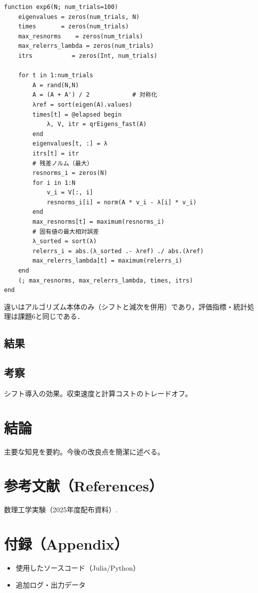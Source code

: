 \documentclass[a4paper,11pt]{ltjsarticle}
\begin{document}
\begin{verbatim}
function exp6(N; num_trials=100)
    eigenvalues = zeros(num_trials, N)
    times       = zeros(num_trials)
    max_resnorms    = zeros(num_trials)
    max_relerrs_lambda = zeros(num_trials)
    itrs           = zeros(Int, num_trials)

    for t in 1:num_trials
        A = rand(N,N)
        A = (A + A') / 2            # 対称化
        λref = sort(eigen(A).values)
        times[t] = @elapsed begin
            λ, V, itr = qrEigens_fast(A)
        end
        eigenvalues[t, :] = λ
        itrs[t] = itr
        # 残差ノルム（最大）
        resnorms_i = zeros(N)
        for i in 1:N
            v_i = V[:, i]
            resnorms_i[i] = norm(A * v_i - λ[i] * v_i)
        end
        max_resnorms[t] = maximum(resnorms_i)
        # 固有値の最大相対誤差
        λ_sorted = sort(λ)
        relerrs_i = abs.(λ_sorted .- λref) ./ abs.(λref)
        max_relerrs_lambda[t] = maximum(relerrs_i)
    end
    (; max_resnorms, max_relerrs_lambda, times, itrs)
end
\end{verbatim}

違いはアルゴリズム本体のみ（シフトと減次を併用）であり，評価指標・統計処理は課題6と同じである．


\subsection{結果}

\subsection{考察}
シフト導入の効果。収束速度と計算コストのトレードオフ。

\section{結論}
主要な知見を要約。今後の改良点を簡潔に述べる。

\section*{参考文献（References）}
\begin{thebibliography}{99}
 数理工学実験（2025年度配布資料）.
\end{thebibliography}

\section*{付録（Appendix）}
\begin{itemize}
  \item 使用したソースコード（Julia/Python）
  \item 追加ログ・出力データ
\end{itemize}
\end{document}
